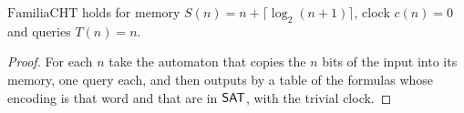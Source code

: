 \begin{theorem}
  \label{thm:dynamics-family-nonuniform}
  \leanok
  $\mathrm{FamiliaCHT}$ holds for memory $S(n) = n + \lceil \log_2 (n+1) \rceil$, clock $c(n) = 0$
  and queries $T(n) = n$.
  \own{}
\end{theorem}

\begin{proof}
  \leanok
  For each $n$ take the automaton that copies the $n$ bits of the input into its memory, one query
  each, and then outputs by a table of the formulas whose encoding is that word and that are in
  $\mathsf{SAT}$, with the trivial clock.
\end{proof}
